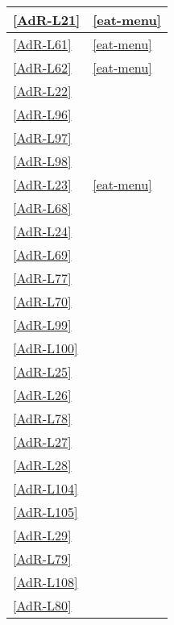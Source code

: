 \begin{longtable}{|P{6cm}|P{6cm}|}
	\hline \ref{AdR-L21} &  \linebreak \ref{eat-menu} \\ %
	\hline \ref{AdR-L61} &  \linebreak \ref{eat-menu} \\
	\hline \ref{AdR-L62} &  \linebreak \ref{eat-menu} \\
	\hline \ref{AdR-L22} &  \\
	\hline \ref{AdR-L96} &  \\
	\hline \ref{AdR-L97} &  \\ %
	\hline \ref{AdR-L98} &  \\
	\hline \ref{AdR-L23} &  \linebreak \ref{eat-menu} \\
	\hline \ref{AdR-L68} &  \\
	\hline \ref{AdR-L24} &  \\
	\hline \ref{AdR-L69} &  \\ %
	\hline \ref{AdR-L77} &  \\
	\hline \ref{AdR-L70} &  \\
	\hline \ref{AdR-L99} &  \\
	\hline \ref{AdR-L100} &  \\
	\hline \ref{AdR-L25} &  \\ %
	\hline \ref{AdR-L26} &  \\
	\hline \ref{AdR-L78} &  \\
	\hline \ref{AdR-L27} &  \\
	\hline \ref{AdR-L28} &  \\
	\hline \ref{AdR-L104} &  \\ %
	\hline \ref{AdR-L105} &  \\
	\hline \ref{AdR-L29} &  \\
	\hline \ref{AdR-L79} &  \\
	\hline \ref{AdR-L108} &  \\
	\hline \ref{AdR-L80} &  \\ %

\end{longtable}
